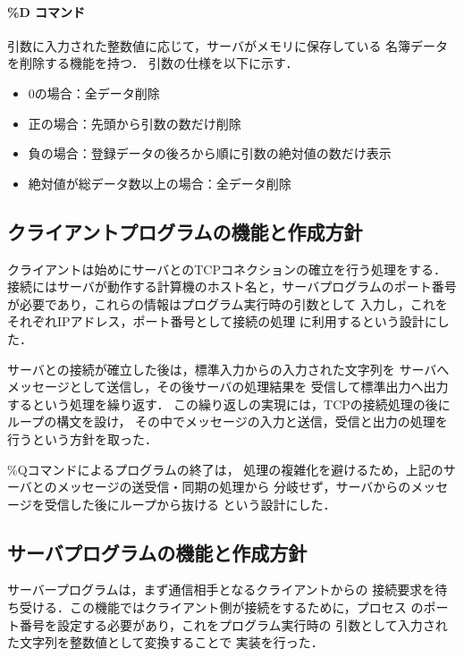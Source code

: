 \paragraph*{\%D コマンド}
引数に入力された整数値に応じて，サーバがメモリに保存している
名簿データを削除する機能を持つ．
引数の仕様を以下に示す．
\begin{itemize}
  \item $0$の場合：全データ削除
  \item 正の場合：先頭から引数の数だけ削除
  \item 負の場合：登録データの後ろから順に引数の絶対値の数だけ表示
  \item 絶対値が総データ数以上の場合：全データ削除
\end{itemize}

\subsection{クライアントプログラムの機能と作成方針} \label{sec:func-client}
クライアントは始めにサーバとのTCPコネクションの確立を行う処理をする．
接続にはサーバが動作する計算機のホスト名と，サーバプログラムのポート番号
が必要であり，これらの情報はプログラム実行時の引数として
入力し，これをそれぞれIPアドレス，ポート番号として接続の処理
に利用するという設計にした．

サーバとの接続が確立した後は，標準入力からの入力された文字列を
サーバへメッセージとして送信し，その後サーバの処理結果を
受信して標準出力へ出力するという処理を繰り返す．
この繰り返しの実現には，TCPの接続処理の後にループの構文を設け，
その中でメッセージの入力と送信，受信と出力の処理を行うという方針を取った．

\%Qコマンドによるプログラムの終了は，
処理の複雑化を避けるため，上記のサーバとのメッセージの送受信・同期の処理から
分岐せず，サーバからのメッセージを受信した後にループから抜ける
という設計にした．

\subsection{サーバプログラムの機能と作成方針}
サーバープログラムは，まず通信相手となるクライアントからの
接続要求を待ち受ける．この機能ではクライアント側が接続をするために，プロセス
のポート番号を設定する必要があり，これをプログラム実行時の
引数として入力された文字列を整数値として変換することで
実装を行った．

